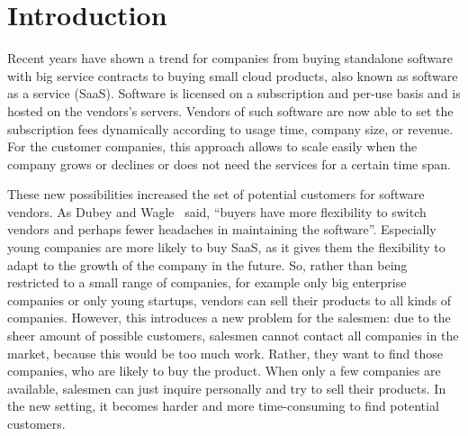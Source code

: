 

\section{Introduction}
\label{sec:introduction}

Recent years have shown a trend for companies from buying standalone software with big service contracts to buying small cloud products, also known as software as a service (SaaS).
Software is licensed on a subscription and per-use basis and is hosted on the vendors's servers.
Vendors of such software are now able to set the subscription fees dynamically according to usage time, company size, or revenue.
For the customer companies, this approach allows to scale easily when the company grows or declines or does not need the services for a certain time span.

These new possibilities increased the set of potential customers for software vendors.
As Dubey and Wagle~\cite{dubey2007delivering} said, ``buyers have more flexibility to switch vendors and perhaps fewer headaches in maintaining the software''.
Especially young companies are more likely to buy SaaS, as it gives them the flexibility to adapt to the growth of the company in the future.
So, rather than being restricted to a small range of companies, for example only big enterprise companies or only young startups, vendors can sell their products to all kinds of companies.
However, this introduces a new problem for the salesmen: due to the sheer amount of possible customers, salesmen cannot contact all companies in the market, because this would be too much work.
Rather, they want to find those companies, who are likely to buy the product.
When only a few companies are available, salesmen can just inquire personally and try to sell their products.
In the new setting, it becomes harder and more time-consuming to find potential customers.

